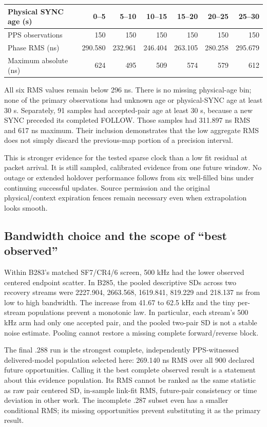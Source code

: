 \documentclass[10pt,letterpaper]{article}
\begin{document}
\begin{center}\small
\begin{tabular}{@{}lrrrrrr@{}}\toprule
Physical SYNC age (s)&0--5&5--10&10--15&15--20&20--25&25--30\\\midrule
PPS observations&150&150&150&150&150&150\\
Phase RMS (ns)&290.580&232.961&246.404&263.105&280.258&295.679\\
Maximum absolute (ns)&624&495&509&574&579&612\\\bottomrule
\end{tabular}
\end{center}
All six RMS values remain below 296 ns. There is no missing physical-age bin;
none of the primary observations had unknown age or physical-SYNC age at least
30 s. Separately, 91 samples had accepted-pair age at least 30 s, because a new
SYNC preceded its completed FOLLOW. Those samples had 311.897 ns RMS and
617 ns maximum. Their inclusion demonstrates that the low aggregate RMS does
not simply discard the previous-map portion of a precision interval.

This is stronger evidence for the tested sparse clock than a low fit residual
at packet arrival. It is still sampled, calibrated evidence from one future
window. No outage or extended holdover performance follows from six well-filled
bins under continuing successful updates. Source permission and the original
physical/context expiration fences remain necessary even when extrapolation
looks smooth.

\subsection{Bandwidth choice and the scope of ``best observed''}
Within B283's matched SF7/CR4/6 screen, 500 kHz had the lower observed centered
endpoint scatter. In B285, the pooled descriptive SDs across two recovery
streams were 2227.904, 2663.568, 1619.841, 819.229 and 218.137 ns from low to
high bandwidth. The increase from 41.67 to 62.5 kHz and the tiny per-stream
populations prevent a monotonic law. In particular, each stream's 500 kHz
arm had only one accepted pair, and the pooled two-pair SD is not a stable
noise estimate. Pooling cannot restore a missing complete forward/reverse block.

The final .288 run is the strongest complete, independently PPS-witnessed
delivered-model population selected here: 269.140 ns RMS over all 900 declared
future opportunities. Calling it the best complete observed result is a
statement about this evidence population. Its RMS cannot be ranked as the
same statistic as raw pair centered SD, in-sample link-fit RMS, future-pair
consistency or time deviation in other work. The incomplete .287 subset even
has a smaller conditional RMS; its missing opportunities prevent substituting
it as the primary result.
\end{document}
